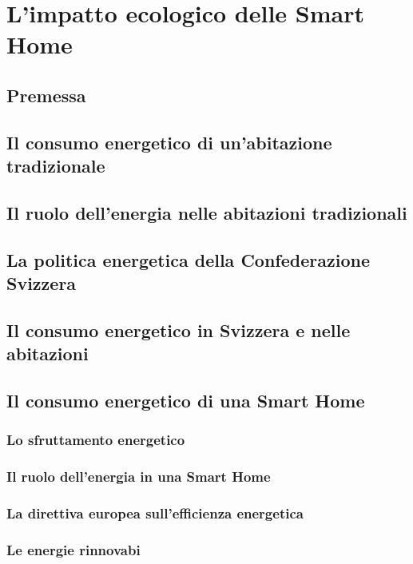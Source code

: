 \documentclass{article}
\begin{document}
\section{L'impatto ecologico delle Smart Home}

\subsection{Premessa}

\subsection{Il consumo energetico di un’abitazione tradizionale}

\subsection{Il ruolo dell’energia nelle abitazioni tradizionali}

\subsection{La politica energetica della Confederazione Svizzera}

\subsection{Il consumo energetico in Svizzera e nelle abitazioni}

\subsection{Il consumo energetico di una Smart Home}

\subsubsection{Lo sfruttamento energetico}

\subsubsection{Il ruolo dell’energia in una Smart Home}

\subsubsection{La direttiva europea sull’efficienza energetica}

\subsubsection{Le energie rinnovabi}

\end{document}
